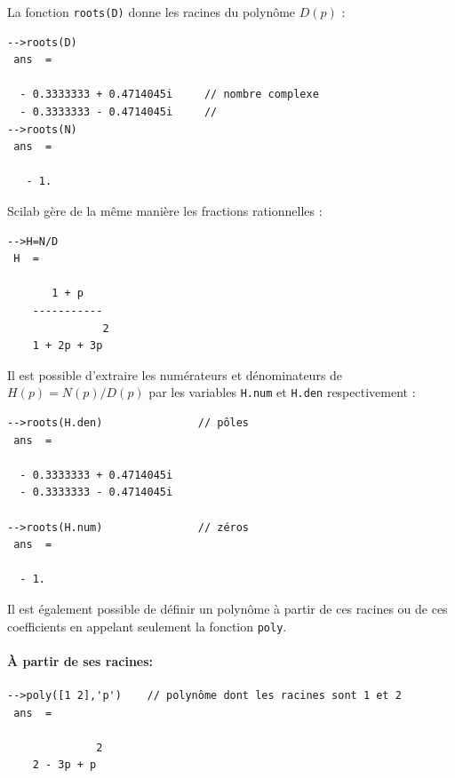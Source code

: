 La fonction \verb?roots(D)? donne les racines du polynôme $D(p)$ :

\begin{code}
\begin{verbatim}
-->roots(D)
 ans  =
 
  - 0.3333333 + 0.4714045i     // nombre complexe 
  - 0.3333333 - 0.4714045i     // 
-->roots(N)
 ans  =
  
   - 1.
\end{verbatim}
\end{code}

Scilab gère de la même manière les fractions rationnelles :
\begin{code}
\begin{verbatim}
-->H=N/D
 H  =
 
       1 + p      
    -----------   
               2  
    1 + 2p + 3p 
\end{verbatim}
\end{code}

Il est possible d'extraire les numérateurs et dénominateurs de 
$H(p)=N(p)/D(p)$ par les variables \verb?H.num? et \verb?H.den? 
respectivement :
\begin{code}
\begin{verbatim}
-->roots(H.den)               // pôles
 ans  =
 
  - 0.3333333 + 0.4714045i  
  - 0.3333333 - 0.4714045i

-->roots(H.num)               // zéros
 ans  =
 
  - 1.
\end{verbatim}
\end{code}

Il est également possible de définir un polynôme à partir de ces racines 
ou de ces coefficients en appelant seulement la fonction \verb?poly?.

\paragraph{\`A partir de ses racines:}

\begin{code}
\begin{verbatim}
-->poly([1 2],'p')    // polynôme dont les racines sont 1 et 2
 ans  =
 
              2  
    2 - 3p + p 
\end{verbatim}
\end{code}

